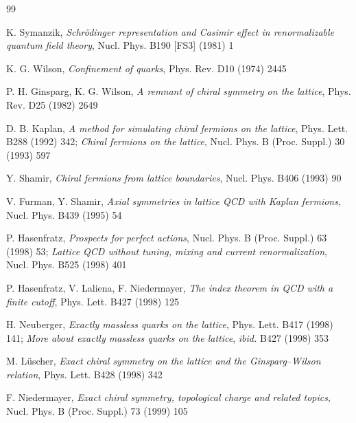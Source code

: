 \begin{thebibliography}{99}

K. Symanzik,
{\it Schr\"odinger representation and Casimir effect in
renormalizable quantum field theory},
Nucl. Phys. B190 [FS3] (1981) 1



K. G. Wilson, {\it Confinement of quarks}, Phys. Rev. D10 (1974) 2445




P. H. Ginsparg, K. G. Wilson,
{\it A remnant of chiral symmetry on the lattice},
Phys. Rev. D25 (1982) 2649



D. B. Kaplan,
{\it A method for simulating chiral fermions on the lattice},
Phys. Lett. B288 (1992) 342;
{\it Chiral fermions on the lattice},
Nucl. Phys. B (Proc. Suppl.) 30 (1993) 597

Y. Shamir,
{\it Chiral fermions from lattice boundaries},
Nucl. Phys. B406 (1993) 90

V. Furman, Y. Shamir,
{\it Axial symmetries in lattice QCD with Kaplan fermions},
Nucl. Phys. B439 (1995) 54



P. Hasenfratz, {\it Prospects for perfect actions},
Nucl. Phys. B (Proc. Suppl.) 63 (1998) 53;
{\it Lattice QCD without tuning, mixing and current renormalization},
Nucl. Phys. B525 (1998) 401

P. Hasenfratz, V. Laliena, F. Niedermayer,
{\it The index theorem in QCD with a finite cutoff},
Phys. Lett. B427 (1998) 125



H. Neuberger,
{\it Exactly massless quarks on the lattice},
Phys. Lett. B417 (1998) 141;
{\it More about exactly massless quarks on the lattice},
{\it ibid.}\/ B427 (1998) 353



M. L\"uscher,
{\it Exact chiral symmetry on the lattice and the Ginsparg--Wilson relation},
Phys. Lett. B428 (1998) 342

F. Niedermayer,
{\it Exact chiral symmetry, topological charge and related topics},
Nucl. Phys. B (Proc. Suppl.) 73 (1999) 105



\end{thebibliography}
